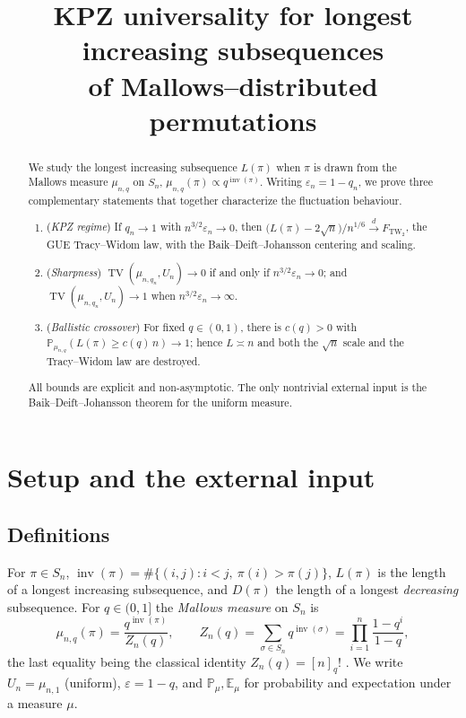 \documentclass[12pt]{article}
\theoremstyle{definition}
\DeclareMathOperator{\inv}{inv}
\DeclareMathOperator{\TV}{TV}
\newcommand{\TW}{\mathrm{TW}_2}
\newcommand{\E}{\mathbb{E}}
\newcommand{\PP}{\mathbb{P}}
\newcommand{\eps}{\varepsilon}
\begin{document}
\title{KPZ universality for longest increasing subsequences \\ of Mallows--distributed permutations}
\author{}
\date{}
\maketitle

\begin{abstract}
We study the longest increasing subsequence $L(\pi)$ when $\pi$ is drawn from the
Mallows measure $\mu_{n,q}$ on $S_n$, $\mu_{n,q}(\pi)\propto q^{\inv(\pi)}$. Writing
$\eps_n=1-q_n$, we prove three complementary statements that together characterize the
fluctuation behaviour.
\begin{enumerate}
\item[(A)] (\emph{KPZ regime}) If $q_n\to1$ with $n^{3/2}\eps_n\to0$, then
$\big(L(\pi)-2\sqrt n\big)/n^{1/6}\xrightarrow{d}F_{\TW}$, the GUE Tracy--Widom law,
with the Baik--Deift--Johansson centering and scaling.
\item[(B)] (\emph{Sharpness}) $\TV(\mu_{n,q_n},U_n)\to0$ if and only if
$n^{3/2}\eps_n\to0$; and $\TV(\mu_{n,q_n},U_n)\to1$ when $n^{3/2}\eps_n\to\infty$.
\item[(C)] (\emph{Ballistic crossover}) For fixed $q\in(0,1)$, there is $c(q)>0$ with
$\PP_{\mu_{n,q}}(L(\pi)\ge c(q)\,n)\to1$; hence $L\asymp n$ and both the
$\sqrt n$ scale and the Tracy--Widom law are destroyed.
\end{enumerate}
All bounds are explicit and non-asymptotic. The only nontrivial external input is the
Baik--Deift--Johansson theorem for the uniform measure.
\end{abstract}

\section{Setup and the external input}\label{sec:setup}

\subsection{Definitions}
For $\pi\in S_n$, $\inv(\pi)=\#\{(i,j):i<j,\ \pi(i)>\pi(j)\}$, $L(\pi)$ is the length of
a longest increasing subsequence, and $D(\pi)$ the length of a longest \emph{decreasing}
subsequence. For $q\in(0,1]$ the \emph{Mallows measure} on $S_n$ is
\begin{equation}\label{eq:mallows}
\mu_{n,q}(\pi)=\frac{q^{\inv(\pi)}}{Z_n(q)},\qquad
Z_n(q)=\sum_{\sigma\in S_n}q^{\inv(\sigma)}=\prod_{i=1}^{n}\frac{1-q^{i}}{1-q},
\end{equation}
the last equality being the classical identity $Z_n(q)=[n]_q!$ \cite[\S1.3]{Stanley}.
We write $U_n=\mu_{n,1}$ (uniform), $\eps=1-q$, and $\PP_\mu,\E_\mu$ for probability and
expectation under a measure $\mu$.
\end{document}
